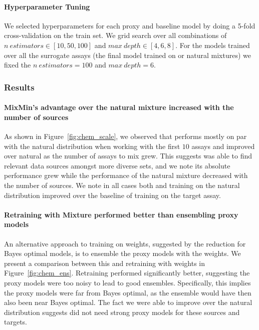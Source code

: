 \paragraph{Hyperparameter Tuning} We selected hyperparameters for each proxy and baseline model by doing a 5-fold cross-validation on the train set. We grid search over all combinations of $n~estimators \in [10,50,100]$ and $max~depth \in [4,6,8]$. For the models trained over all the surrogate assays (the final model trained on \method or natural mixtures) we fixed the $n~estimators = 100$ and $max~depth = 6$.






\subsubsection{Results}



\paragraph{MixMin's advantage over the natural mixture increased with the number of sources} As shown in Figure~\ref{fig:chem_scale}, we observed that \method performs mostly on par with the natural distribution when 
working with the first $10$ assays and improved over natural as the number of assays to mix grew. This suggests \method was able to find relevant data sources amongst more diverse sets, and we note its absolute performance grew while the performance of the natural mixture decreased with the number of sources. We note in all cases both \method and training on the natural distribution improved over the baseline of training on the target assay.
 



\paragraph{Retraining with \method Mixture performed better than ensembling proxy models} An alternative approach to training on \method weights, suggested by the reduction for Bayes optimal models, is to ensemble the proxy models with the \method weights. We present a comparison between this and retraining with \method weights in Figure~\ref{fig:chem_ens}. Retraining performed significantly better, suggesting the proxy models were too noisy to lead to good ensembles. Specifically, this implies the proxy models were far from Bayes optimal, as the ensemble would have then also been near Bayes optimal. The fact we were able to improve over the natural distribution suggests \method did not need strong proxy models for these sources and targets.


